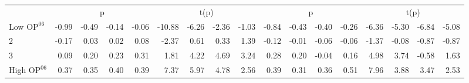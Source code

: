 \begin{table}[!ht]
\begin{tabular}{lrrrrrrrrrrrrrrrr}
  
     & \multicolumn{4}{c}{p} & \multicolumn{4}{c}{t(p)}  & \multicolumn{4}{c}{p} & \multicolumn{4}{c}{t(p)}   \\
     \cmidrule(r){2-5} \cmidrule(r){6-9}  \cmidrule(r){10-13} \cmidrule(r){14-17} 
    Low $\text{OP}^{06}$  & -0.99  & -0.49  & -0.14  & -0.06  & -10.88  & -6.26  & -2.36  & -1.03  & -0.84  & -0.43  & -0.40  & -0.26  & -6.36  & -5.30  & -6.84  & -5.08   \\
    2  & -0.17  & 0.03  & 0.02  & 0.08  & -2.37  & 0.61  & 0.33  & 1.39  & -0.12  & -0.01  & -0.06  & -0.06  & -1.37  & -0.08  & -0.87  & -0.87   \\
    3  & 0.09  & 0.20  & 0.23  & 0.31  & 1.81  & 4.22  & 4.69  & 3.24  & 0.28  & 0.20  & -0.04  & 0.16  & 4.98  & 3.74  & -0.58  & 1.63   \\
    High $\text{OP}^{06}$  & 0.37  & 0.35  & 0.40  & 0.39  & 7.37  & 5.97  & 4.78  & 2.56  & 0.39  & 0.31  & 0.36  & 0.51  & 7.96  & 3.88  & 3.47  & 2.53   \\
    
  
  \bottomrule
\end{tabular}
\label{tbl:32_Size_BM_OP_B16}
\end{table}
